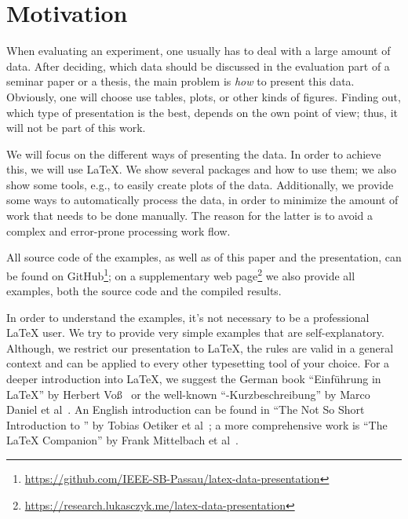 \section{Motivation}

When evaluating an experiment, one usually has to deal with a large amount of
data.  After deciding, which data should be discussed in the evaluation part of
a seminar paper or a thesis, the main problem is \emph{how} to present this
data. Obviously, one will choose use tables, plots, or other kinds of figures.
Finding out, which type of presentation is the best, depends on the own point of
view; thus, it will not be part of this work.

We will focus on the different ways of presenting the data.  In order to achieve
this, we will use \LaTeX\@.  We show several packages and how to use them; we
also show some tools, e.g., to easily create plots of the data.  Additionally,
we provide some ways to automatically process the data, in order to minimize the
amount of work that needs to be done manually.  The reason for the latter is to
avoid a complex and error-prone processing work flow.

All source code of the examples, as well as of this paper and the presentation,
can be found on GitHub\footnote{\label{footnote-github}%
  \href{https://github.com/IEEE-SB-Passau/latex-data-presentation}%
    {https://github.com/IEEE-SB-Passau/latex-data-presentation}}; on a
supplementary web page\footnote{\label{footnote-webpage}%
  \href{https://research.lukasczyk.me/latex-data-presentation}%
    {https://research.lukasczyk.me/latex-data-presentation}} we also provide all
examples, both the source code and the compiled results.

In order to understand the examples, it's not necessary to be a professional
\LaTeX{} user.  We try to provide very simple examples that are
self-explanatory.  Although, we restrict our presentation to \LaTeX{}, the rules
are valid in a general context and can be applied to every other typesetting
tool of your choice.  For a deeper introduction into \LaTeX{}, we suggest the
German book \enquote{Einführung in \LaTeX} by Herbert Voß~\cite{Voss2012} or the
well-known \enquote{-Kurzbeschreibung} by Marco Daniel et
al~\cite{Daniel2015}.  An English introduction can be found in \enquote{The Not
So Short Introduction to } by Tobias Oetiker et
al~\cite{Oetiker2015}; a more comprehensive work is \enquote{The \LaTeX{}
Companion} by Frank Mittelbach et al~\cite{Mittelbach2008}.
